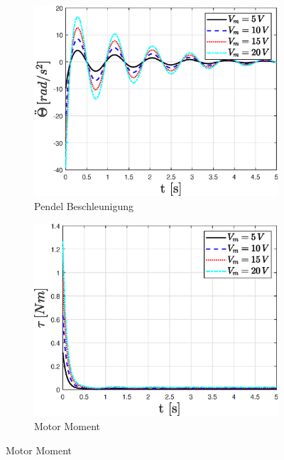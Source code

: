 \begin{figure}
\begin{subfigure}[b]{0.49 \linewidth}
    \end{subfigure}
    \begin{subfigure}[b]{0.49 \linewidth}
        \includegraphics[width=\linewidth]{Bilder/5_sensi/fig/Vm_sprung/theta_punkt_punkt.eps}
        \caption{Pendel Beschleunigung}
        \label{fig:Vm_sprung_theta_punkt_punkt}
    \end{subfigure}
    \begin{subfigure}[b]{0.49\linewidth}
        \includegraphics[width=\linewidth]{Bilder/5_sensi/fig/Vm_sprung/tau.eps}
        \caption{Motor Moment}
        \label{fig:Vm_sprung_tau}
    \end{subfigure}

\end{figure}
